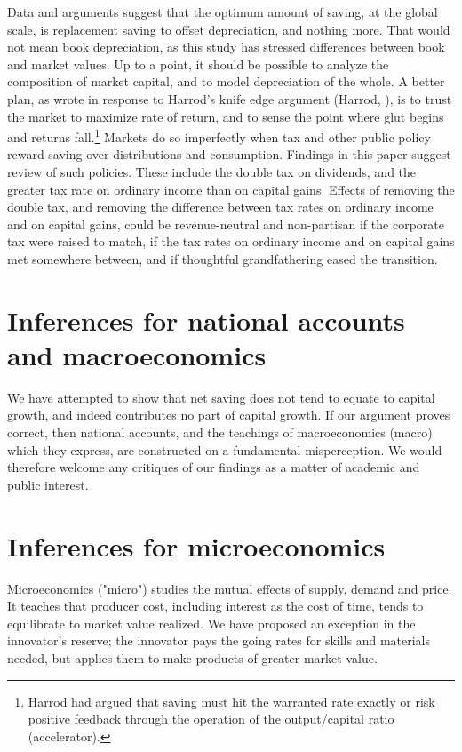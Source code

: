 \documentclass[a4paper,fleqn]{latex_styles/cas-sc}
\begin{document}
Data and arguments suggest that the optimum amount of
saving, at the global scale, is replacement saving to offset depreciation, and nothing
more. That would not mean book depreciation, as this study has stressed
differences between book and market values. Up to a point, it should be
possible to analyze the composition of market capital, and to model
depreciation of the whole. A better plan, as
\citet{solowContributionTheoryEconomic1956a} wrote in response to
Harrod's knife edge argument (Harrod, \citeyear{harrodEssayDynamicTheory1939}), is to
trust the market to maximize rate of return, and to sense the point
where glut begins and returns fall.\footnote{Harrod had argued that
saving must hit the warranted rate exactly or risk positive
feedback through the operation of the output/capital ratio
(accelerator).}
%
Markets do so imperfectly when tax and other public policy reward
saving over distributions and consumption. Findings in this paper
suggest review of such policies. These include the double tax on
dividends, and the greater tax rate on ordinary income than on capital
gains. Effects of removing the double tax, and removing the difference
between tax rates on ordinary income and on capital gains, could be
revenue-neutral and non-partisan if the corporate tax were raised to
match, if the tax rates on ordinary income and on capital gains met
somewhere between, and if thoughtful grandfathering eased the
transition.

\section{Inferences for national accounts and macroeconomics}

We have attempted to show that net saving does not tend to equate to capital growth, and indeed contributes no part of capital growth. If our argument proves correct, then national accounts, and the teachings of macroeconomics (macro) which they express, are constructed on a fundamental misperception. We would therefore welcome any critiques of our findings as a matter of academic and public interest.

\section{Inferences for microeconomics}

Microeconomics ("micro") studies the mutual effects of supply, demand and price. It teaches that producer cost, including interest as the cost of time, tends to equilibrate to market value realized. We have proposed an exception in the innovator's reserve; the innovator pays the going rates for skills and materials needed, but applies them to make products of greater market value.
\end{document}
